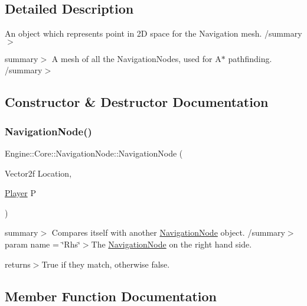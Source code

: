 \subsection{Detailed Description}
An object which represents point in 2D space for the Navigation mesh. /summary$>$ 

summary$>$ A mesh of all the Navigation\+Nodes, used for A$\ast$ pathfinding. /summary$>$ 

\subsection{Constructor \& Destructor Documentation}
\mbox{\label{struct_engine_1_1_core_1_1_navigation_node_ae3912b3f6efd3ba94b71bdab5d70a049}} 
\subsubsection{\texorpdfstring{Navigation\+Node()}{NavigationNode()}}
{\footnotesize\ttfamily Engine\+::\+Core\+::\+Navigation\+Node\+::\+Navigation\+Node (\begin{DoxyParamCaption}\item[{Vector2f}]{Location,  }\item[{\hyperlink{class_engine_1_1_game_play_1_1_player}{Player}}]{P }\end{DoxyParamCaption})}

summary$>$ Compares itself with another \hyperlink{struct_engine_1_1_core_1_1_navigation_node}{Navigation\+Node} object. /summary$>$ param name = \char`\"{}\+Rhs\char`\"{}$>$The \hyperlink{struct_engine_1_1_core_1_1_navigation_node}{Navigation\+Node} on the right hand side.

returns$>$True if they match, otherwise false.

\subsection{Member Function Documentation}
\mbox{\label{struct_engine_1_1_core_1_1_navigation_node_ac61bc4291a133693de436a3e875c8c39}} 
